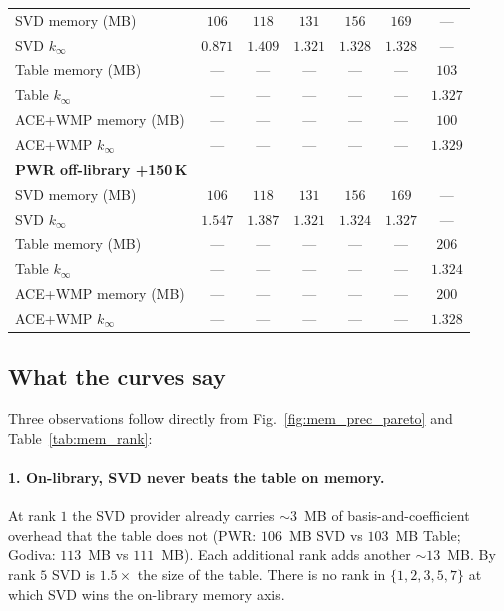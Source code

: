 \begin{table}[t]
\begin{tabular}{@{}lcccccc@{}}
\quad SVD memory (MB)            & $106$ & $118$ & $131$ & $156$ & $169$ & --- \\
\quad SVD $k_\infty$             & $0.871$ & $1.409$ & $1.321$ & $1.328$ & $1.328$ & --- \\
\quad Table memory (MB)          & ---   & ---   & ---   & ---   & ---   & $103$ \\
\quad Table $k_\infty$           & ---   & ---   & ---   & ---   & ---   & $1.327$ \\
\quad ACE+WMP memory (MB)        & ---   & ---   & ---   & ---   & ---   & $100$ \\
\quad ACE+WMP $k_\infty$         & ---   & ---   & ---   & ---   & ---   & $1.329$ \\
\midrule
\textbf{PWR off-library +150\,K} & & & & & & \\
\quad SVD memory (MB)            & $106$ & $118$ & $131$ & $156$ & $169$ & --- \\
\quad SVD $k_\infty$              & $1.547$ & $1.387$ & $1.321$ & $1.324$ & $1.327$ & --- \\
\quad Table memory (MB)          & ---   & ---   & ---   & ---   & ---   & $206$ \\
\quad Table $k_\infty$           & ---   & ---   & ---   & ---   & ---   & $1.324$ \\
\quad ACE+WMP memory (MB)        & ---   & ---   & ---   & ---   & ---   & $200$ \\
\quad ACE+WMP $k_\infty$         & ---   & ---   & ---   & ---   & ---   & $1.328$ \\
\bottomrule
\end{tabular}
\end{table}

\subsection{What the curves say}

Three observations follow directly from
Fig.~\ref{fig:mem_prec_pareto} and Table~\ref{tab:mem_rank}:

\paragraph{1. On-library, SVD never beats the table on memory.}
At rank $1$ the SVD provider already carries $\sim\!3$~MB of
basis-and-coefficient overhead that the table does not (PWR:
$106$~MB SVD vs $103$~MB Table; Godiva: $113$~MB vs $111$~MB).
Each additional rank adds another $\sim\!13$~MB. By rank $5$
SVD is $1.5\times$ the size of the table. There is no rank in
$\{1,2,3,5,7\}$ at which SVD wins the on-library memory axis.

